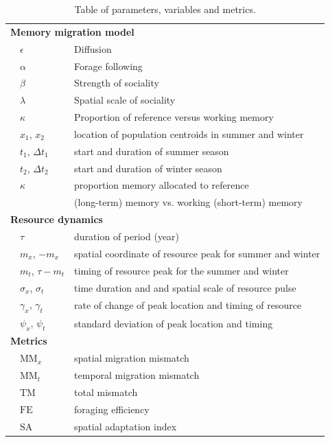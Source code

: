 \documentclass[utf8]{frontiersSCNS} %
\begin{document}
\begin{table}[b!]
	\caption{\label{table_definitions} Table of parameters, variables and metrics.}
	
	\centering
	\begin{tabular}{ll|l}
		\hline\hline
		\multicolumn{3}{l}{\textbf{Memory migration model}}\\ 
		& $\epsilon$ & Diffusion \\ 
		& $\alpha$ & Forage following \\ 
		& $\beta$ & Strength of sociality \\ 
		& $\lambda$ & Spatial scale of sociality \\ 
		& $\kappa$ & Proportion of reference versus working memory \\ 
		& $x_1$, $x_2$ & location of population centroids in summer and winter \\ 
		& $t_1$, $\Delta t_1$ & start and duration of summer season \\ 
		& $t_2$, $\Delta t_2$ & start and duration of winter season \\ 
		& $\kappa$ & proportion memory allocated to reference \\
		&& (long-term) memory vs. working (short-term) memory \\ 
		\multicolumn{3}{l}{\textbf{Resource dynamics}} \\ 
		& $\tau$ & duration of period (year) \\ 
		& $m_x$, $-m_x$ & spatial coordinate of resource peak for summer and winter \\ 
		& $m_t$, $\tau - m_t$ & timing of resource peak for the summer and winter \\ 
		& $\sigma_x$, $\sigma_t$ & time duration and and spatial scale of resource pulse \\ 
		& $\gamma_x$, $\gamma_t$ & rate of change of peak location and timing of resource \\ 
		& $\psi_x$, $\psi_t$ & standard deviation of peak location and timing \\ 
		\multicolumn{3}{l}{\textbf{Metrics}}\\ 
		& $\text{MM}_x$ & spatial migration mismatch \\ 
		& $\text{MM}_t$ & temporal migration mismatch \\ 
		& $\text{TM}$ & total mismatch \\ 
		& $\text{FE}$ & foraging efficiency \\ 
		& $\text{SA}$ & spatial adaptation index \\ 
		\hline\hline
	\end{tabular}
\end{table}
\end{document}
